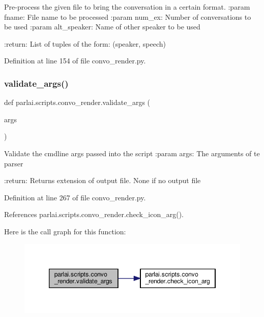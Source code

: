 \begin{DoxyVerb}Pre-process the given file to bring the conversation in a certain format.
:param fname: File name to be processed
:param num_ex: Number of conversations to be used
:param alt_speaker: Name of other speaker to be used

:return: List of tuples of the form: (speaker, speech)
\end{DoxyVerb}
 

Definition at line 154 of file convo\+\_\+render.\+py.

\mbox{\label{namespaceparlai_1_1scripts_1_1convo__render_a4078a037f4f5526297e7860fbed9cfb2}} 
\subsubsection{\texorpdfstring{validate\+\_\+args()}{validate\_args()}}
{\footnotesize\ttfamily def parlai.\+scripts.\+convo\+\_\+render.\+validate\+\_\+args (\begin{DoxyParamCaption}\item[{}]{args }\end{DoxyParamCaption})}

\begin{DoxyVerb}Validate the cmdline args passed into the script
:param args: The arguments of te parser

:return: Returns extension of output file. None if no output file
\end{DoxyVerb}
 

Definition at line 267 of file convo\+\_\+render.\+py.



References parlai.\+scripts.\+convo\+\_\+render.\+check\+\_\+icon\+\_\+arg().

Here is the call graph for this function\+:
\nopagebreak
\begin{figure}[H]
\begin{center}
\leavevmode
\includegraphics[width=346pt]{namespaceparlai_1_1scripts_1_1convo__render_a4078a037f4f5526297e7860fbed9cfb2_cgraph}
\end{center}
\end{figure}


